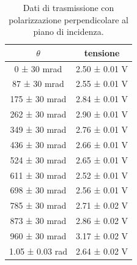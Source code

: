 \documentclass[a4paper]{article}
\begin{document}
\begin{table}[htbp]
\centering
\begin{tabular}{|c|c|}
\hline
$\theta$ & tensione \\\hline\hline
0 ± 30 mrad & 2.50 ± 0.01 V \\
87 ± 30 mrad & 2.55 ± 0.01 V \\
175 ± 30 mrad & 2.84 ± 0.01 V \\
262 ± 30 mrad & 2.90 ± 0.01 V \\
349 ± 30 mrad & 2.76 ± 0.01 V \\
436 ± 30 mrad & 2.66 ± 0.01 V \\
524 ± 30 mrad & 2.65 ± 0.01 V \\
611 ± 30 mrad & 2.52 ± 0.01 V \\
698 ± 30 mrad & 2.56 ± 0.01 V \\
785 ± 30 mrad & 2.71 ± 0.02 V \\
873 ± 30 mrad & 2.86 ± 0.02 V \\
960 ± 30 mrad & 3.17 ± 0.02 V \\
1.05 ± 0.03 rad & 2.64 ± 0.02 V \\
\hline
\end{tabular}
\caption{Dati di trasmissione con polarizzazione perpendicolare al piano di incidenza.}
\label{tab:brewster_perp}
\end{table}
\end{document}
